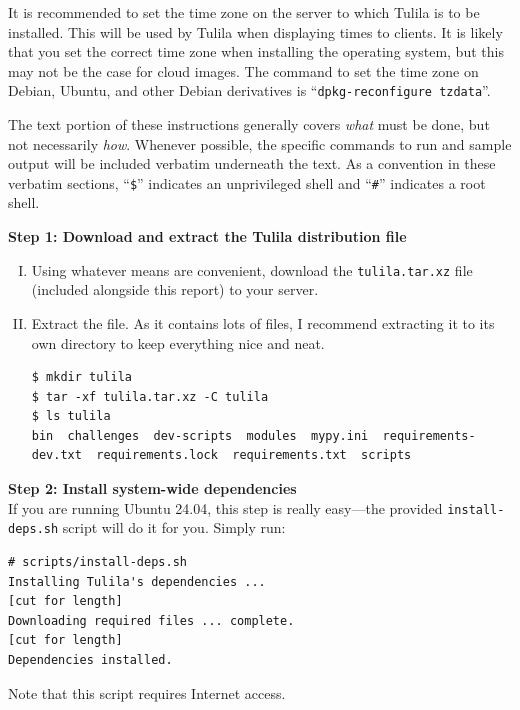 \documentclass[12pt]{article}
\begin{document}
It is recommended to set the time zone on the server to which Tulila is to be installed. This will be used by Tulila when displaying times to clients. It is likely that you set the correct time zone when installing the operating system, but this may not be the case for cloud images. The command to set the time zone on Debian, Ubuntu, and other Debian derivatives is ``\texttt{dpkg-reconfigure tzdata}''.

The text portion of these instructions generally covers \textit{what} must be done, but not necessarily \textit{how}. Whenever possible, the specific commands to run and sample output will be included verbatim underneath the text. As a convention in these verbatim sections, ``\texttt{\$}'' indicates an unprivileged shell and ``\texttt{\#}'' indicates a root shell.

\bigskip
\textbf{Step 1: Download and extract the Tulila distribution file}
\begin{enumerate}[I.]
  \item Using whatever means are convenient, download the \texttt{tulila.tar.xz} file (included alongside this report) to your server.
  \item Extract the file. As it contains lots of files, I recommend extracting it to its own directory to keep everything nice and neat.
  \begin{Verbatim}
$ mkdir tulila
$ tar -xf tulila.tar.xz -C tulila
$ ls tulila
bin  challenges  dev-scripts  modules  mypy.ini  requirements-dev.txt  requirements.lock  requirements.txt  scripts
  \end{Verbatim}
\end{enumerate}

\bigskip
\textbf{Step 2: Install system-wide dependencies}\\
If you are running Ubuntu 24.04, this step is really easy---the provided \texttt{install-deps.sh} script will do it for you. Simply run:

\begin{Verbatim}
# scripts/install-deps.sh
Installing Tulila's dependencies ...
[cut for length]
Downloading required files ... complete.
[cut for length]
Dependencies installed.
\end{Verbatim}

Note that this script requires Internet access.
\end{document}

